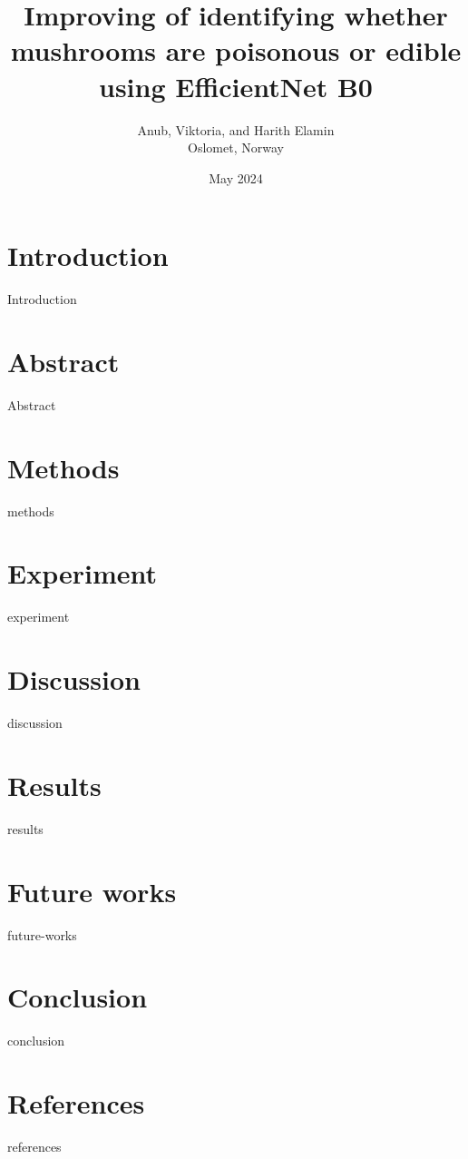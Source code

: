\documentclass{article}
\title{Improving of identifying whether mushrooms are poisonous or edible using EfficientNet B0}
\author{ Anub, Viktoria, and Harith Elamin \\ Oslomet, Norway}
\date{May 2024}
\begin{document}
\maketitle

\begin{multicols}{2}
\section{Introduction}
{Introduction}    
\section{Abstract}
{Abstract}
\section{Methods}
{methods}
\section{Experiment}
{experiment}
\section{Discussion}
{discussion}
\section{Results}
{results}
\section{Future works}
{future-works}
\section{Conclusion}
{conclusion}
\section{References}
{references}
\end{multicols}
\end{document}
